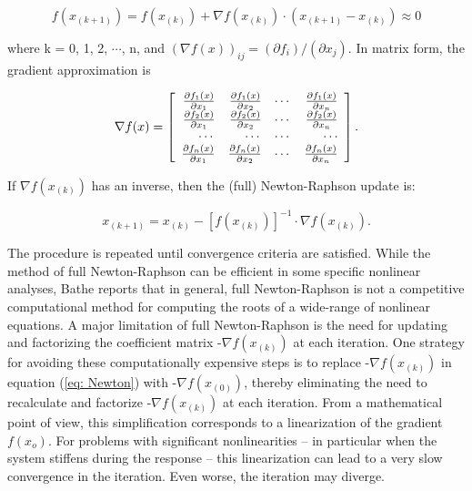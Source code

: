 \[ f(x_{(k+1)}) = f(x_{(k)}) + \nabla f(x_{(k)}) \cdot (x_{(k+1)} - x_{(k)}) \approx 0 \]

\vspace{0.15 in}\noindent
where k = 0, 1, 2, $ \cdots $, n,
and $ (\nabla f(x))_{ij} = (\partial f_i)/(\partial x_j) $.
In matrix form, the gradient approximation is

\begin{equation}
\nabla f(x) = \left [  
\begin{array}{rrrr}
{\partial f_1(x)} \over {\partial x_1} &  {\partial f_1(x)} \over {\partial x_2} & \cdots &
{\partial f_1(x)} \over {\partial x_n} \\
{\partial f_2(x)} \over {\partial x_1} &  {\partial f_2(x)} \over {\partial x_2} & \cdots &
{\partial f_2(x)} \over {\partial x_n} \\
\cdots &  \cdots & \cdots & \cdots    \\
{\partial f_n(x)} \over {\partial x_1} &  {\partial f_n(x)} \over {\partial x_2} & \cdots &
{\partial f_n(x)} \over {\partial x_n} \\
\end{array}
\right ].
\end{equation}

\vspace{0.15 in}\noindent
If $ \nabla f(x_{(k)})$ has an inverse,
then the (full) Newton-Raphson update is:

\begin{equation}
x_{(k+1)} = x_{(k)} - {\left[ f(x_{(k)}) \right]}^{-1} \cdot {\nabla f(x_{(k)})}.
\label{eq: Newton}
\end{equation}

\vspace{0.15 in}\noindent
The procedure is repeated until convergence criteria are satisfied.
While the method of full Newton-Raphson can be efficient in
some specific nonlinear analyses,
Bathe \cite{bathe76,bathe80} reports that in general,
full Newton-Raphson is not a competitive computational method
for computing the roots of a wide-range of nonlinear equations.
A major limitation of full Newton-Raphson is the need for
updating and factorizing the coefficient
matrix -$ \nabla f(x_{(k)}) $ at each iteration.
One strategy for avoiding these computationally expensive steps is to
replace -$ \nabla f(x_{(k)}) $ in equation (\ref{eq: Newton})
with -$\nabla f(x_{(0)})$, thereby eliminating
the need to recalculate and
factorize -$\nabla f(x_{(k)})$ at each iteration. From a mathematical
point of view, this simplification corresponds to a linearization of the gradient $f(x_o)$.
For problems with significant nonlinearities -- in particular when the system
stiffens during the response -- this linearization can lead to a
very slow convergence in the iteration.
Even worse, the iteration may diverge. 

